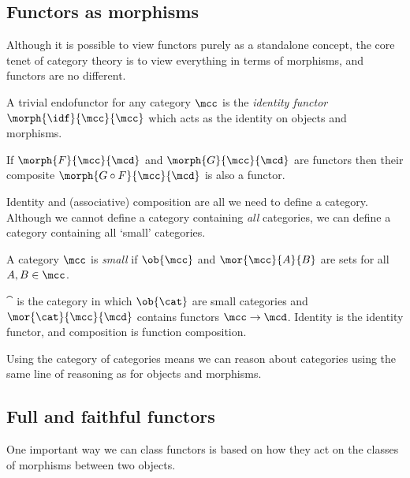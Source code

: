 \subsection{Functors as morphisms}

Although it is possible to view functors purely as a standalone concept, the
core tenet of category theory is to view everything in terms of morphisms, and
functors are no different.

\begin{example}
    A trivial endofunctor for any category \(\mcc\) is the
    \emph{identity functor} \(\morph{\idf}{\mcc}{\mcc}\) which acts as the
    identity on objects and morphisms.
\end{example}

\begin{example}
    If \(\morph{F}{\mcc}{\mcd}\) and \(\morph{G}{\mcc}{\mcd}\) are functors
    then their composite \(\morph{G \circ F}{\mcc}{\mcd}\) is also a functor.
\end{example}

Identity and (associative) composition are all we need to define a category.
Although we cannot define a category containing \emph{all} categories, we can
define a category containing all `small' categories.

\begin{definition}
    A category \(\mcc\) is \emph{small} if \(\ob{\mcc}\) and
    \(\mor{\mcc}{A}{B}\) are sets for all \(A, B \in \mcc\).
\end{definition}

\begin{example}
    \(\cat\) is the category in which \(\ob{\cat}\) are small categories and
    \(\mor{\cat}{\mcc}{\mcd}\) contains functors \(\mcc \to \mcd\).
    Identity is the identity functor, and composition is function composition.
\end{example}

Using the category of categories means we can reason about categories using the
same line of reasoning as for objects and morphisms.

\subsection{Full and faithful functors}

One important way we can class functors is based on how they act on the classes
of morphisms between two objects.

